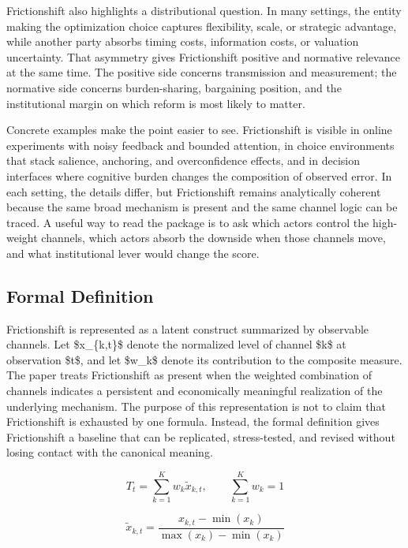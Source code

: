 \documentclass[12pt]{article}
\begin{document}
Frictionshift also highlights a distributional question. In many settings, the entity making the optimization choice captures flexibility, scale, or strategic advantage, while another party absorbs timing costs, information costs, or valuation uncertainty. That asymmetry gives Frictionshift positive and normative relevance at the same time. The positive side concerns transmission and measurement; the normative side concerns burden-sharing, bargaining position, and the institutional margin on which reform is most likely to matter.

Concrete examples make the point easier to see. Frictionshift is visible in online experiments with noisy feedback and bounded attention, in choice environments that stack salience, anchoring, and overconfidence effects, and in decision interfaces where cognitive burden changes the composition of observed error. In each setting, the details differ, but Frictionshift remains analytically coherent because the same broad mechanism is present and the same channel logic can be traced. A useful way to read the package is to ask which actors control the high-weight channels, which actors absorb the downside when those channels move, and what institutional lever would change the score.

\subsection{Formal Definition}
Frictionshift is represented as a latent construct summarized by observable channels. Let \$x\_\{k,t\}\$ denote the normalized level of channel \$k\$ at observation \$t\$, and let \$w\_k\$ denote its contribution to the composite measure. The paper treats Frictionshift as present when the weighted combination of channels indicates a persistent and economically meaningful realization of the underlying mechanism. The purpose of this representation is not to claim that Frictionshift is exhausted by one formula. Instead, the formal definition gives Frictionshift a baseline that can be replicated, stress-tested, and revised without losing contact with the canonical meaning.

\begin{equation}
T_t = \sum_{k=1}^K w_k \tilde{x}_{k,t}, \qquad \sum_{k=1}^K w_k = 1
\label{eq:index}
\end{equation}

\begin{equation}
\tilde{x}_{k,t} = \frac{x_{k,t} - \min(x_k)}{\max(x_k) - \min(x_k)}
\label{eq:norm}
\end{equation}
\end{document}
